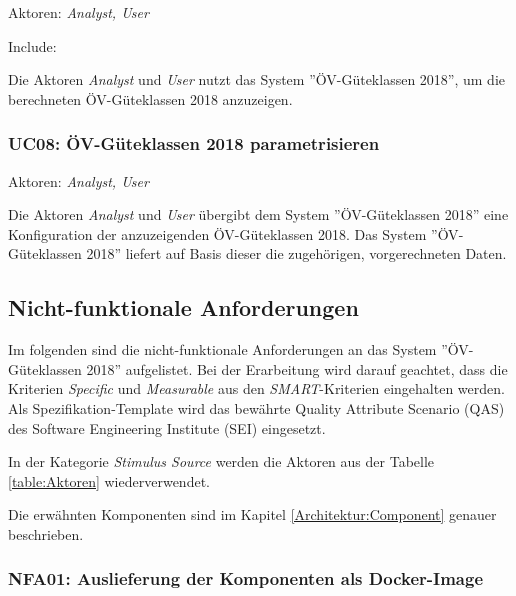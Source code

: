 Aktoren: \emph{Analyst, User}

Include: 

Die Aktoren \emph{Analyst} und \emph{User} nutzt das System ''\acs{ÖV}-Güteklassen 2018'', um die berechneten \acs{ÖV}-Güteklassen 2018 anzuzeigen.


\subsubsection{UC08: ÖV-Güteklassen 2018 parametrisieren}
\label{Use Cases:UC08}

Aktoren: \emph{Analyst, User}

Die Aktoren \emph{Analyst} und \emph{User} übergibt dem System ''\acs{ÖV}-Güteklassen 2018'' eine Konfiguration der anzuzeigenden \acs{ÖV}-Güteklassen 2018.
Das System ''\acs{ÖV}-Güteklassen 2018'' liefert auf Basis dieser die zugehörigen, vorgerechneten Daten.

\subsection{Nicht-funktionale Anforderungen}
\label{Anforderungsspezifikation:Nicht-funktionale Anforderungen}

Im folgenden sind die nicht-funktionale Anforderungen an das System ''\acs{ÖV}-Güteklassen 2018'' aufgelistet.
Bei der Erarbeitung wird darauf geachtet, dass die Kriterien \emph{Specific} und \emph{Measurable} aus den \emph{SMART}-Kriterien\cite{SMART} eingehalten werden.
Als Spezifikation-Template wird das bewährte Quality Attribute Scenario (QAS) des Software Engineering Institute (SEI)\cite{BassSoftwareArchitecture2012} eingesetzt.

In der Kategorie \emph{Stimulus Source} werden die Aktoren aus der Tabelle \ref{table:Aktoren} wiederverwendet.

Die erwähnten Komponenten sind im Kapitel \ref{Architektur:Component} genauer beschrieben.

\subsubsection{NFA01: Auslieferung der Komponenten als Docker-Image}
\label{NFA:NFA01}

